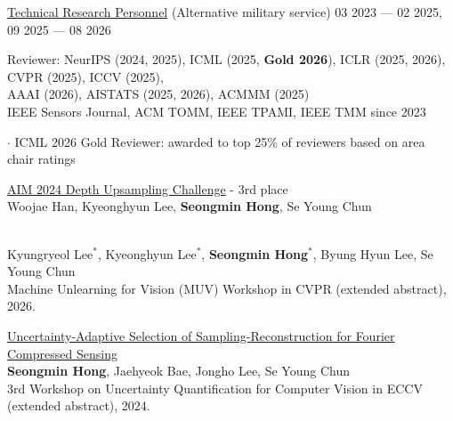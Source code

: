 \begin{cvcontent}
\href{https://elaw.klri.re.kr/kor_service/jomunPrint.do?hseq=10572&cseq=235795}{Technical Research Personnel} (Alternative military service)
\hfill 03 2023 --- 02 2025, 09 2025 --- 08 2026

Reviewer: NeurIPS (2024, 2025), ICML (2025, \textbf{Gold 2026}), ICLR (2025, 2026), CVPR (2025), ICCV (2025), \\ AAAI (2026), AISTATS (2025, 2026), ACMMM (2025)\\ IEEE Sensors Journal, ACM TOMM, IEEE TPAMI, IEEE TMM \hfill since 2023

{\small $\cdot$ ICML 2026 Gold Reviewer: awarded to top 25\% of reviewers based on area chair ratings}

\end{cvcontent}
\begin{cvcontent}
\href{https://codalab.lisn.upsaclay.fr/competitions/17339}{AIM 2024 Depth Upsampling Challenge} - 3rd place\\
Woojae Han, Kyeonghyun Lee, \textbf{Seongmin Hong}, Se Young Chun\\

\end{cvcontent}
\begin{cvcontent}
\href{https://arxiv.org/abs/2603.10445}{}\\
Kyungryeol Lee$^*$, Kyeonghyun Lee$^*$, \textbf{Seongmin Hong}$^*$, Byung Hyun Lee, Se Young Chun\\
Machine Unlearning for Vision (MUV) Workshop in CVPR (extended abstract), 2026.

\href{https://uncertainty-cv.github.io/2024/papers/}{Uncertainty-Adaptive Selection of Sampling-Reconstruction for Fourier Compressed Sensing}\\
\textbf{Seongmin Hong}, Jaehyeok Bae, Jongho Lee, Se Young Chun\\
3rd Workshop on Uncertainty Quantification for Computer Vision in ECCV (extended abstract), 2024.

\end{cvcontent}

